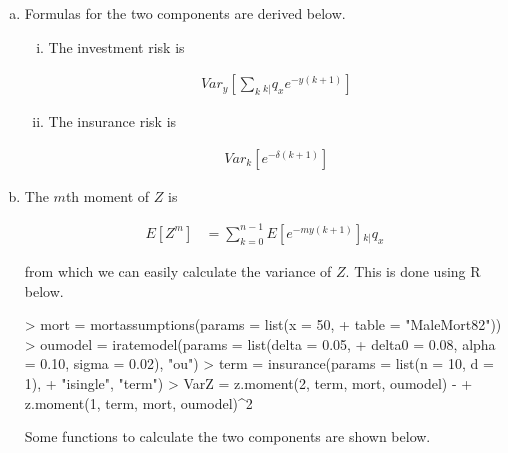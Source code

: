 \documentclass[12pt]{article}
\numberwithin{questioncounter}{section}
\begin{document}
\begin{solution}

\begin{enumerate}[(a)]
\item Formulas for the two components are derived below.

\begin{enumerate}[(i)]
\item The investment risk is

\begin{align*}
Var_{y} \left[\sum_{k} {}_{k|}q_{x} e^{-y(k+1)}\right]
\end{align*}

\item The insurance risk is

\begin{align*}
Var_{k}[e^{-\delta(k+1)}]
\end{align*}

\end{enumerate}

\item The $m$th moment of $Z$ is

\begin{align*}
E[Z^{m}] &= \sum_{k=0}^{n-1} E[e^{-my(k+1)}] {}_{k|}q_{x}
\end{align*}

from which we can easily calculate the variance of $Z$. This is done using R below.

\begin{Schunk}
\begin{Sinput}
> mort = mortassumptions(params = list(x = 50, 
+ 	table = "MaleMort82"))
> oumodel = iratemodel(params = list(delta = 0.05, 
+ 	delta0 = 0.08, alpha = 0.10, sigma = 0.02), "ou")
> term = insurance(params = list(n = 10, d = 1), 
+ "isingle", "term")
> VarZ = z.moment(2, term, mort, oumodel) - 
+   z.moment(1, term, mort, oumodel)^2    
\end{Sinput}
\end{Schunk}
 
Some functions to calculate the two components are shown below. 
  
\begin{Schunk}
\end{Schunk}


\end{enumerate}
\end{solution}
\end{document}
